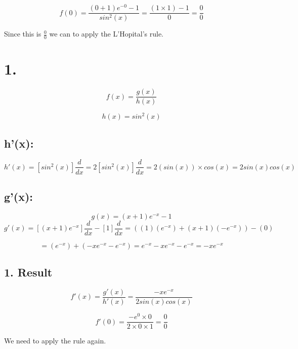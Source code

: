 \begin{solutionbox}{}

\[
    f(0) = \frac{(0+1)e^{-0}-1}{sin^2(x)} = \frac{(1 \times 1) - 1}{0} = \frac{0}{0}
\]

Since this is $\frac{0}{0}$ we can to apply the L'Hopital's rule.

\section*{1.}
\[
    f(x) = \frac{g(x)}{h(x)}
\]

\[
    h(x) = sin^2(x)
\]

\subsection*{h'(x):}
\[
    h'(x) = [sin^2(x)] \frac{d}{dx} = 2[sin^2(x)] \frac{d}{dx} = 2(sin(x))\times cos(x) = 2sin(x)cos(x)
\]


\subsection*{g'(x):}
\[
    g(x) = (x + 1)e^{-x}-1
\]
\[
    g'(x) = [(x + 1)e^{-x}]\frac{d}{dx} - [1] \frac{d}{dx} = ((1)(e^{-x}) + (x + 1)(-e^{-x})) - (0)
\]

\[
    = (e^{-x}) + (-xe^{-x} - e^{-x}) = e^{-x} - xe^{-x} - e^{-x} = -xe^{-x}
\]

\subsection*{1. Result}
\[
    f'(x) = \frac{g'(x)}{h'(x)} = \frac{-xe^{-x}}{2sin(x)cos(x)}
\]

\[
    f'(0) = \frac{-e^{0} \times 0}{2\times0\times1} = \frac{0}{0}
\]

We need to apply the rule again.

\end{solutionbox}\newpage
